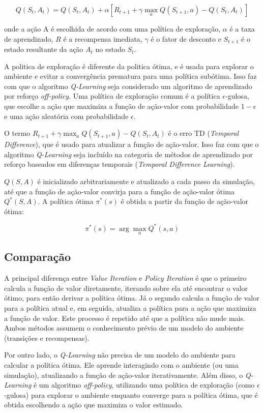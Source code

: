 \begin{equation}
    Q(S_t, A_t) = Q(S_t, A_t) + \alpha [R_{t+1} + \gamma \max_{a} Q(S_{t+1}, a) - Q(S_t, A_t)]
\end{equation}

onde a ação A é escolhida de acordo com uma política de exploração, $\alpha$ é a taxa de aprendizado, $R$ é a recompensa imediata, $\gamma$ é o fator de desconto e $S_{t+1}$ é o estado resultante da ação $A_t$ no estado $S_t$. 

A politica de exploração é diferente da politica ótima, e é usada para explorar o ambiente e evitar a convergência prematura para uma política subótima. Isso faz com que o algoritmo \textit{Q-Learning} seja considerado um algoritmo de aprendizado por reforço \textit{off-policy}. Uma política de exploração comum é a política $\epsilon$-gulosa, que escolhe a ação que maximiza a função de ação-valor com probabilidade $1 - \epsilon$ e uma ação aleatória com probabilidade $\epsilon$.

O termo $R_{t+1} + \gamma \max_{a} Q(S_{t+1}, a) - Q(S_t, A_t)$ é o erro TD (\textit{Temporal Difference}), que é usado para atualizar a função de ação-valor. Isso faz com que o algoritmo \textit{Q-Learning} seja incluído na categoria de métodos de aprendizado por reforço baseados em diferenças temporais (\textit{Temporal Difference Learning}).

$Q(S, A)$ é inicializado arbitrariamente e atualizado a cada passo da simulação, até que a função de ação-valor convirja para a função de ação-valor ótima $Q^*(S, A)$. A política ótima $\pi^*(s)$ é obtida a partir da função de ação-valor ótima:

\begin{equation}
    \pi^*(s) = \arg\max_a Q^*(s, a)
\end{equation}

\subsection*{Comparação}

A principal diferença entre \textit{Value Iteration} e \textit{Policy Iteration} é que o primeiro calcula a função de valor diretamente, iterando sobre ela até encontrar o valor ótimo, para então derivar a política ótima. Já o segundo calcula a função de valor para a política atual e, em seguida, atualiza a política para a ação que maximiza a função de valor. Este processo é repetido até que a política não mude mais. Ambos métodos assumem o conhecimento prévio de um modelo do ambiente (transições e recompensas).

Por outro lado, o \textit{Q-Learning} não precisa de um modelo do ambiente para calcular a política ótima. Ele aprende interagindo com o ambiente (ou uma simulação), atualizando a função de ação-valor iterativamente. Além disso, o \textit{Q-Learning} é um algoritmo \textit{off-policy}, utilizando uma política de exploração (como $\epsilon$-gulosa) para explorar o ambiente enquanto converge para a política ótima, que é obtida escolhendo a ação que maximiza o valor estimado.